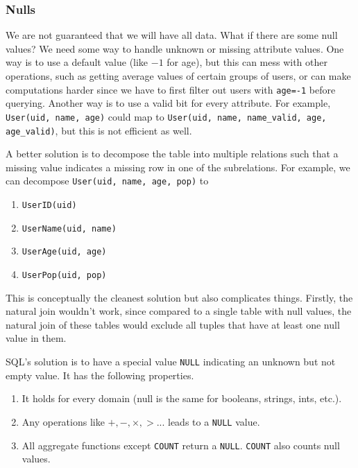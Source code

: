   \subsubsection{Nulls}

    We are not guaranteed that we will have all data. What if there are some null values? We need some way to handle unknown or missing attribute values. One way is to use a default value (like $-1$ for age), but this can mess with other operations, such as getting average values of certain groups of users, or can make computations harder since we have to first filter out users with \texttt{age=-1} before querying. Another way is to use a valid bit for every attribute. For example, \texttt{User(uid, name, age)} could map to \texttt{User(uid, name, name\_valid, age, age\_valid)}, but this is not efficient as well. 

    A better solution is to decompose the table into multiple relations such that a missing value indicates a missing row in one of the subrelations. For example, we can decompose \texttt{User(uid, name, age, pop)} to 
    \begin{enumerate}
      \item \texttt{UserID(uid)}
      \item \texttt{UserName(uid, name)}
      \item \texttt{UserAge(uid, age)}
      \item \texttt{UserPop(uid, pop)}
    \end{enumerate}
    This is conceptually the cleanest solution but also complicates things. Firstly, the natural join wouldn't work, since compared to a single table with null values, the natural join of these tables would exclude all tuples that have at least one null value in them. 

    \begin{definition}
      SQL's solution is to have a special value \texttt{NULL} indicating an unknown but not empty value. It has the following properties. 
      \begin{enumerate}
        \item It holds for every domain (null is the same for booleans, strings, ints, etc.). 
        \item Any operations like $+, -, \times, >$... leads to a \texttt{NULL} value. 
        \item All aggregate functions except \texttt{COUNT} return a \texttt{NULL}. \texttt{COUNT} also counts null values. 
      \end{enumerate}
    \end{definition}

